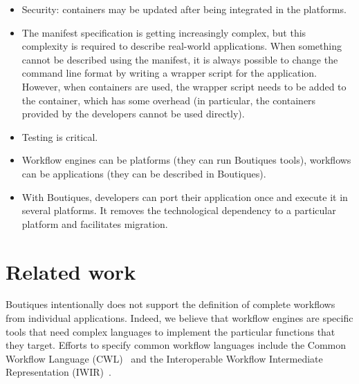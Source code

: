 \documentclass{article}
\begin{document}
\begin{itemize}
\item Security: containers may be updated after being integrated in the platforms.
\item The manifest specification is getting increasingly complex, but
  this complexity is required to describe real-world
  applications. When something cannot be described using the manifest,
  it is always possible to change the command line format by writing a
  wrapper script for the application. However, when containers are
  used, the wrapper script needs to be added to the container, which
  has some overhead (in particular, the containers provided by the
  developers cannot be used directly).
\item Testing is critical.
\item Workflow engines can be platforms (they can run Boutiques tools), workflows can be applications (they can be described in Boutiques).
\item With Boutiques, developers can port their application once and execute it in several platforms. It removes the technological dependency to a particular platform and facilitates migration. 
\end{itemize}

\section{Related work}

Boutiques intentionally does not support the definition of complete
workflows from individual applications. Indeed, we believe that
workflow engines are specific tools that need complex languages to
implement the particular functions that they target. Efforts to
specify common workflow languages include the Common Workflow Language
(CWL)~\cite{cwl} and the Interoperable Workflow Intermediate
Representation (IWIR)~\cite{plankensteiner2011iwir}.
\end{document}
